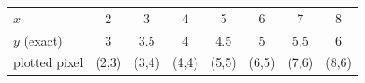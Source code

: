 \begin{center}
\renewcommand{\arraystretch}{1.2}
\begin{tabular}{l *{7}{c}}
\toprule
$x$ & 2 & 3 & 4 & 5 & 6 & 7 & 8 \\
$y$ (exact) & 3 & 3.5 & 4 & 4.5 & 5 & 5.5 & 6 \\
plotted pixel & (2,3) & (3,4) & (4,4) & (5,5) & (6,5) & (7,6) & (8,6) \\
\bottomrule
\end{tabular}
\end{center}
